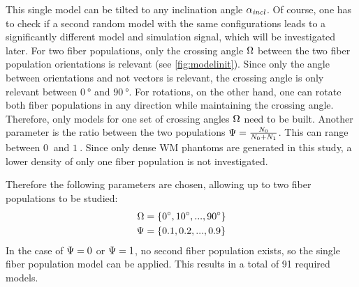 This single model can be tilted to any inclination angle $\textnormal{$\alpha_{\mathit{incl}}$}$.
Of course, one has to check if a second random model with the same configurations leads to a significantly different model and simulation signal, which will be investigated later.
For two fiber populations, only the crossing angle $\textnormal{$\Omega$}$ between the two fiber population orientations is relevant (see \cref{fig:modelinit}).
Since only the angle between orientations and not vectors is relevant, the crossing angle is only relevant between $\SI{0}{\degree}$ and $\SI{90}{\degree}$.
For rotations, on the other hand, one can rotate both fiber populations in any direction while maintaining the crossing angle.
Therefore, only models for one set of crossing angles $\textnormal{$\Omega$}$ need to be built.
Another parameter is the ratio between the two populations $\textnormal{$\Psi$}=\frac{N_0}{N_0+N_1}$.
This can range between $\SI{0}{}$ and $\SI{1}{}$.
Since only dense \ac{WM} phantoms are generated in this study, a lower density of only one fiber population is not investigated.
\par
%
Therefore the following parameters are chosen, allowing up to two fiber populations to be studied:
% 
\begin{align}
    \begin{split}
        \textnormal{$\Omega$} &= \{\SI{0}{\degree}, \SI{10}{\degree}, ..., \SI{90}{\degree}\}\\
        \textnormal{$\Psi$} &= \{\SI{0.1}{}, \SI{0.2}{}, ..., \SI{0.9}{}\}
    \end{split}
\end{align}
% 
In the case of $\textnormal{$\Psi$} = 0$ or $\textnormal{$\Psi$} = 1$, no second fiber population exists, so the single fiber population model can be applied.
This results in a total of 91 required models.
%
% 
% 

